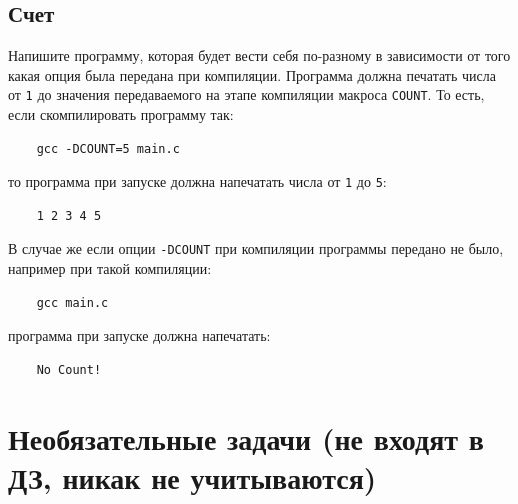 \documentclass[10pt]{article}
\begin{document}
\subsection{Счет}
Напишите программу, которая будет вести себя по-разному в зависимости от того какая опция была передана при компиляции. Программа должна печатать числа от \texttt{1} до значения передаваемого на этапе компиляции макроса \texttt{COUNT}.
То есть, если скомпилировать программу так:
\begin{verbatim}
    gcc -DCOUNT=5 main.c
\end{verbatim}
то программа при запуске должна напечатать числа от \texttt{1} до \texttt{5}:
\begin{verbatim}
    1 2 3 4 5
\end{verbatim}
В случае же если опции \texttt{-DCOUNT} при компиляции программы передано не было, например при такой компиляции:
\begin{verbatim}
    gcc main.c
\end{verbatim}
программа при запуске должна напечатать:
\begin{verbatim}
    No Count!
\end{verbatim}

\newpage


\section*{Необязательные задачи (не входят в ДЗ, никак не учитываются)}
\setcounter{subsection}{0}
\end{document}

